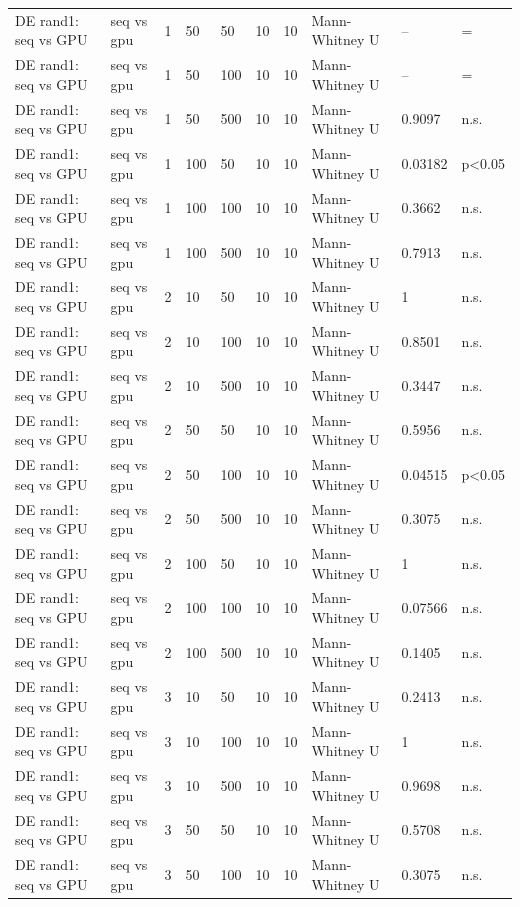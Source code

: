 \begin{table}[t]
\begin{tabular}{llllllllll}
DE rand1: seq vs GPU & seq vs gpu & 1 & 50 & 50 & 10 & 10 & Mann-Whitney U & -- & = \\
DE rand1: seq vs GPU & seq vs gpu & 1 & 50 & 100 & 10 & 10 & Mann-Whitney U & -- & = \\
DE rand1: seq vs GPU & seq vs gpu & 1 & 50 & 500 & 10 & 10 & Mann-Whitney U & 0.9097 & n.s. \\
DE rand1: seq vs GPU & seq vs gpu & 1 & 100 & 50 & 10 & 10 & Mann-Whitney U & 0.03182 & p<0.05 \\
DE rand1: seq vs GPU & seq vs gpu & 1 & 100 & 100 & 10 & 10 & Mann-Whitney U & 0.3662 & n.s. \\
DE rand1: seq vs GPU & seq vs gpu & 1 & 100 & 500 & 10 & 10 & Mann-Whitney U & 0.7913 & n.s. \\
DE rand1: seq vs GPU & seq vs gpu & 2 & 10 & 50 & 10 & 10 & Mann-Whitney U & 1 & n.s. \\
DE rand1: seq vs GPU & seq vs gpu & 2 & 10 & 100 & 10 & 10 & Mann-Whitney U & 0.8501 & n.s. \\
DE rand1: seq vs GPU & seq vs gpu & 2 & 10 & 500 & 10 & 10 & Mann-Whitney U & 0.3447 & n.s. \\
DE rand1: seq vs GPU & seq vs gpu & 2 & 50 & 50 & 10 & 10 & Mann-Whitney U & 0.5956 & n.s. \\
DE rand1: seq vs GPU & seq vs gpu & 2 & 50 & 100 & 10 & 10 & Mann-Whitney U & 0.04515 & p<0.05 \\
DE rand1: seq vs GPU & seq vs gpu & 2 & 50 & 500 & 10 & 10 & Mann-Whitney U & 0.3075 & n.s. \\
DE rand1: seq vs GPU & seq vs gpu & 2 & 100 & 50 & 10 & 10 & Mann-Whitney U & 1 & n.s. \\
DE rand1: seq vs GPU & seq vs gpu & 2 & 100 & 100 & 10 & 10 & Mann-Whitney U & 0.07566 & n.s. \\
DE rand1: seq vs GPU & seq vs gpu & 2 & 100 & 500 & 10 & 10 & Mann-Whitney U & 0.1405 & n.s. \\
DE rand1: seq vs GPU & seq vs gpu & 3 & 10 & 50 & 10 & 10 & Mann-Whitney U & 0.2413 & n.s. \\
DE rand1: seq vs GPU & seq vs gpu & 3 & 10 & 100 & 10 & 10 & Mann-Whitney U & 1 & n.s. \\
DE rand1: seq vs GPU & seq vs gpu & 3 & 10 & 500 & 10 & 10 & Mann-Whitney U & 0.9698 & n.s. \\
DE rand1: seq vs GPU & seq vs gpu & 3 & 50 & 50 & 10 & 10 & Mann-Whitney U & 0.5708 & n.s. \\
DE rand1: seq vs GPU & seq vs gpu & 3 & 50 & 100 & 10 & 10 & Mann-Whitney U & 0.3075 & n.s. \\

\end{tabular}
\end{table}
